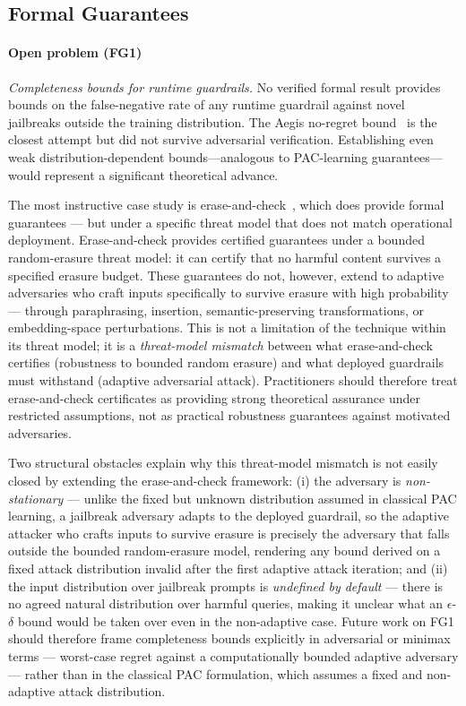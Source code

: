 \subsection{Formal Guarantees}

\paragraph{Open problem (FG1)}
\textit{Completeness bounds for runtime guardrails.}
No verified formal result provides bounds on the false-negative rate of any runtime
guardrail against novel jailbreaks outside the training distribution.
The Aegis no-regret bound~\cite{su2024aegis} is the closest attempt but did not
survive adversarial verification.
Establishing even weak distribution-dependent bounds---analogous to PAC-learning
guarantees---would represent a significant theoretical advance.

The most instructive case study is erase-and-check~\cite{kumar2023certifying}, which does
provide formal guarantees --- but under a specific threat model that does not match
operational deployment.
Erase-and-check provides certified guarantees under a bounded random-erasure threat
model: it can certify that no harmful content survives a specified erasure budget.
These guarantees do not, however, extend to adaptive adversaries who craft inputs
specifically to survive erasure with high probability --- through paraphrasing,
insertion, semantic-preserving transformations, or embedding-space perturbations.
This is not a limitation of the technique within its threat model; it is a
\emph{threat-model mismatch} between what erase-and-check certifies (robustness to
bounded random erasure) and what deployed guardrails must withstand (adaptive
adversarial attack).
Practitioners should therefore treat erase-and-check certificates as providing strong
theoretical assurance under restricted assumptions, not as practical robustness
guarantees against motivated adversaries.

Two structural obstacles explain why this threat-model mismatch is not easily
closed by extending the erase-and-check framework: (i) the adversary is
\emph{non-stationary} --- unlike the fixed but unknown distribution assumed in
classical PAC learning, a jailbreak adversary adapts to the deployed guardrail,
so the adaptive attacker who crafts inputs to survive erasure is precisely the
adversary that falls outside the bounded random-erasure model, rendering any
bound derived on a fixed attack distribution invalid after the first adaptive
attack iteration; and (ii) the input distribution over jailbreak prompts is
\emph{undefined by default} --- there is no agreed natural distribution over
harmful queries, making it unclear what an $\epsilon$-$\delta$ bound would be
taken over even in the non-adaptive case.
Future work on FG1 should therefore frame completeness bounds explicitly in
adversarial or minimax terms --- worst-case regret against a computationally
bounded adaptive adversary --- rather than in the classical PAC formulation,
which assumes a fixed and non-adaptive attack distribution.
